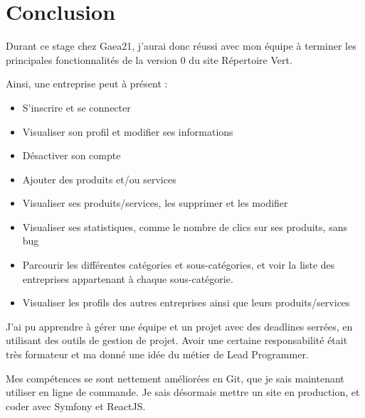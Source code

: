 \section*{Conclusion} 
{}
\thispagestyle{noTitledHeader}

Durant ce stage chez Gaea21, j'aurai donc réussi avec mon équipe à terminer les principales fonctionnalités de la version 0 du site Répertoire Vert.

Ainsi, une entreprise peut à présent :
\begin{itemize}
    \item S'inscrire et se connecter
    \item Visualiser son profil et modifier ses informations
    \item Désactiver son compte
    \item Ajouter des produits et/ou services
    \item Visualiser ses produits/services, les supprimer et les modifier
    \item Visualiser ses statistiques, comme le nombre de clics sur ses produits, sans bug
    \item Parcourir les différentes catégories et sous-catégories, et voir la liste des entreprises appartenant à chaque sous-catégorie.
    \item Visualiser les profils des autres entreprises ainsi que leurs produits/services
\end{itemize}

J'ai pu apprendre à gérer une équipe et un projet avec des deadlines serrées, en utilisant des outils de gestion de projet. 
Avoir une certaine responsabilité était très formateur et ma donné une idée du métier de Lead Programmer.

Mes compétences se sont nettement améliorées en Git, que je sais maintenant utiliser en ligne de commande.
Je sais désormais mettre un site en production, et coder avec Symfony et ReactJS.